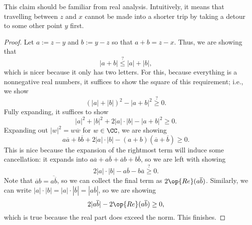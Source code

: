 This claim should be familiar from real analysis. Intuitively, it means that travelling between $z$ and $x$ cannot be made into a shorter trip by taking a detour to some other point $y$ first.
\begin{proof}
	Let $a:=z-y$ and $b:=y-z$ so that $a+b=z-x$. Thus, we are showing that
	\[|a+b|\stackrel?\le|a|+|b|,\]
	which is nicer because it only has two letters. For this, because everything is a nonnegative real numbers, it suffices to show the square of this requirement; i.e., we show
	\[(|a|+|b|)^2-|a+b|^2\stackrel?\ge0.\]
	Fully expanding, it suffices to show
	\[|a|^2+|b|^2+2|a|\cdot|b|-|a+b|^2\ge0.\]
	Expanding out $|w|^2=w\overline w$ for $w\in\CC$, we are showing
	\[a\overline a+b\overline b+2|a|\cdot|b|-(a+b)(\overline a+\overline b)\ge0.\]
	This is nice because the expansion of the rightmost term will induce some cancellation: it expands into $a\overline a+a\overline b+\overline ab+b\overline b$, so we are left with showing
	\[2|a|\cdot|b|-a\overline b-b\overline a\stackrel?\ge0.\]
	Note that $\overline ab=\overline{a\overline b}$, so we can collect the final term as $2\op{Re}(a\overline b)$. Similarly, we can write $|a|\cdot|b|=|a|\cdot|\overline b|=|a\overline b|$, so we are showing
	\[2|a\overline b|-2\op{Re}(a\overline b)\ge0,\]
	which is true because the real part does exceed the norm. This finishes.
\end{proof}